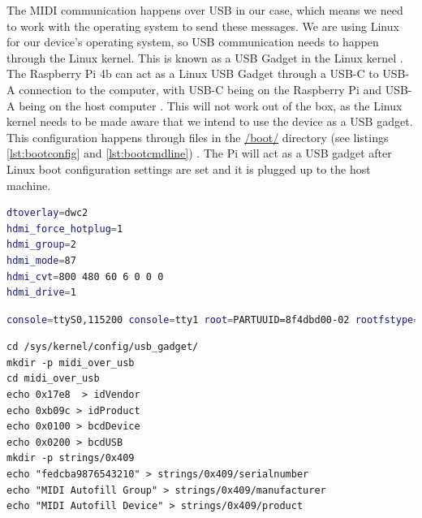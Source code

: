The MIDI communication happens over USB in our case, which means we need to work with the
operating system to send these messages. We are using Linux for our device's operating
system, so USB communication needs to happen through the Linux kernel. This is known as a
USB Gadget in the Linux kernel \autocite{usbGadgetDocumentation}. The Raspberry Pi 4b can
act as a Linux USB Gadget through a USB-C to USB-A connection to the computer, with USB-C
being on the Raspberry Pi and USB-A being on the host computer
\autocite{raspberryPiGadgetSetup}. This will not work out of the box, as the Linux kernel
needs to be made aware that we intend to use the device as a USB gadget. This
configuration happens through files in the \url{/boot/} directory
(see listings \ref{lst:bootconfig} and
\ref{lst:bootcmdline}) \autocite{raspberryPiGadgetSetup}. The Pi will act as a USB
gadget after Linux boot configuration settings are set and it is plugged up to the host
machine.

\begin{minipage}{\linewidth}

  \begin{lstlisting}[language=bash,
  label={lst:bootconfig},
  caption=Lines added to /boot/config.txt \autocite{raspberryPiGadgetSetup, raspberryPiHDMIFix}.]
dtoverlay=dwc2
hdmi_force_hotplug=1
hdmi_group=2
hdmi_mode=87
hdmi_cvt=800 480 60 6 0 0 0
hdmi_drive=1
  \end{lstlisting}

  \begin{lstlisting}[language=bash, label={lst:bootcmdline}, caption=DietPi /boot/cmdline.txt modified to allow a USB Gadget \autocite{raspberryPiGadgetSetup}., breaklines=true]
console=ttyS0,115200 console=tty1 root=PARTUUID=8f4dbd00-02 rootfstype=ext4 elevator=deadline fsck.repair=yes rootwait quiet net.ifnames=0 modules-load=dwc2,g_ether
  \end{lstlisting}

  \begin{lstlisting}[label={lst:usb_gadget}, caption=Bash procedure to setup a MIDI Gadget\, modified for our device \autocite{raspberryPiGadgetSetup}., breaklines=true]
cd /sys/kernel/config/usb_gadget/
mkdir -p midi_over_usb
cd midi_over_usb
echo 0x17e8  > idVendor
echo 0xb09c > idProduct
echo 0x0100 > bcdDevice
echo 0x0200 > bcdUSB
mkdir -p strings/0x409
echo "fedcba9876543210" > strings/0x409/serialnumber
echo "MIDI Autofill Group" > strings/0x409/manufacturer
echo "MIDI Autofill Device" > strings/0x409/product
  \end{lstlisting}

\end{minipage}

